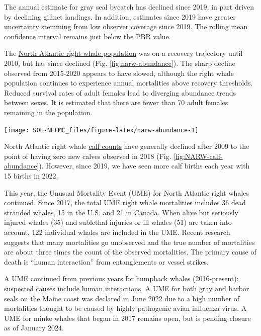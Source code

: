 \documentclass[
  10pt,
]{article}
\let\origfigure\figure
\let\endorigfigure\endfigure
\renewenvironment{figure}[1][2] {
    \expandafter\origfigure\expandafter[H]
} {
    \endorigfigure
}
\begin{document}
The annual estimate for gray seal bycatch has declined since 2019, in part driven by declining gillnet landings. In addition, estimates since 2019 have greater uncertainty stemming from low observer coverage since 2019. The rolling mean confidence interval remains just below the PBR value.

The \href{https://noaa-edab.github.io/catalog/narw.html}{North Atlantic right whale population} was on a recovery trajectory until 2010, but has since declined (Fig. \ref{fig:narw-abundance}). The sharp decline observed from 2015-2020 appears to have slowed, although the right whale population continues to experience annual mortalities above recovery thresholds. Reduced survival rates of adult females lead to diverging abundance trends between sexes. It is estimated that there are fewer than 70 adult females remaining in the population.

\begin{figure}

{\centering \texttt{[image: SOE-NEFMC\_files/figure-latex/narw-abundance-1]} 

}

\caption{Estimated North Atlanic right whale abundance on the Northeast Shelf.}\label{fig:narw-abundance}
\end{figure}

North Atlantic right whale \href{https://noaa-edab.github.io/catalog/narw.html}{calf counts} have generally declined after 2009 to the point of having zero new calves observed in 2018 (Fig. \ref{fig:NARW-calf-abundance}). However, since 2019, we have seen more calf births each year with 15 births in 2022.

This year, the Unusual Mortality Event (UME) for North Atlantic right whales continued. Since 2017, the total UME right whale mortalities includes 36 dead stranded whales, 15 in the U.S. and 21 in Canada. When alive but seriously injured whales (35) and sublethal injuries or ill whales (51) are taken into account, 122 individual whales are included in the UME. Recent research suggests that many mortalities go unobserved and the true number of mortalities are about three times the count of the observed mortalities. The primary cause of death is ``human interaction'' from entanglements or vessel strikes.

A UME continued from previous years for humpback whales (2016-present); suspected causes include human interactions. A UME for both gray and harbor seals on the Maine coast was declared in June 2022 due to a high number of mortalities thought to be caused by highly pathogenic avian influenza virus. A UME for minke whales that began in 2017 remains open, but is pending closure as of January 2024.
\end{document}
